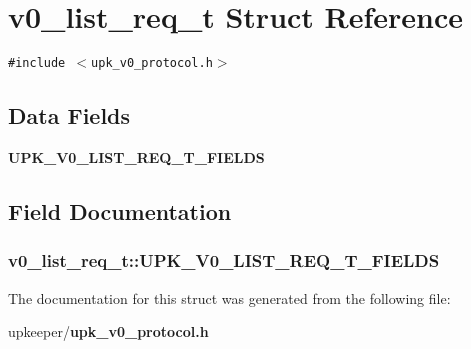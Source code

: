 \section{v0\_\-list\_\-req\_\-t Struct Reference}
\label{structv0__list__req__t}
{\tt \#include $<$upk\_\-v0\_\-protocol.h$>$}

\subsection*{Data Fields}
\begin{CompactItemize}
\item 
\bf{UPK\_\-V0\_\-LIST\_\-REQ\_\-T\_\-FIELDS}
\end{CompactItemize}


\subsection{Field Documentation}
\subsubsection{\setlength{\rightskip}{0pt plus 5cm}\bf{v0\_\-list\_\-req\_\-t::UPK\_\-V0\_\-LIST\_\-REQ\_\-T\_\-FIELDS}}\label{structv0__list__req__t_95d8ffd7d2e892b911f9bf3c166edce2}




The documentation for this struct was generated from the following file:\begin{CompactItemize}
\item 
upkeeper/\bf{upk\_\-v0\_\-protocol.h}\end{CompactItemize}
